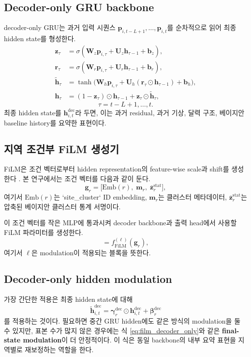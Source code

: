 \documentclass[11pt,a4paper]{article}
\begin{document}
\subsection{Decoder-only GRU backbone}
decoder-only GRU는 과거 입력 시퀀스 $\bm p_{i,t-L+1},\dots,\bm p_{i,t}$를 순차적으로 읽어 최종 hidden state를 형성한다.
\begin{align}
    \bm z_{\tau} &= \sigma(\bm W_z \bm p_{i,\tau} + \bm U_z \bm h_{\tau-1} + \bm b_z), \\
    \bm r_{\tau} &= \sigma(\bm W_r \bm p_{i,\tau} + \bm U_r \bm h_{\tau-1} + \bm b_r), \\
    \tilde{\bm h}_{\tau} &= \tanh\!\Big(\bm W_h \bm p_{i,\tau} + \bm U_h (\bm r_{\tau}\odot \bm h_{\tau-1}) + \bm b_h\Big), \\
    \bm h_{\tau} &= (1-\bm z_{\tau})\odot \bm h_{\tau-1} + \bm z_{\tau}\odot \tilde{\bm h}_{\tau},
\end{align}
\begin{equation}
    \tau=t-L+1,\dots,t.
\end{equation}
최종 hidden state를 $\bm h_{i,t}^{\mathrm{dec}}$라 두면, 이는 과거 residual, 과거 기상, 달력 구조, 베이지안 baseline history를 요약한 표현이다.

\subsection{지역 조건부 FiLM 생성기}
FiLM은 조건 벡터로부터 hidden representation의 feature-wise scale과 shift를 생성한다 \citep{Perez2017FiLM}. 본 연구에서는 조건 벡터를 다음과 같이 둔다.
\begin{equation}
    \bm g_r = \Big[
    \mathrm{Emb}(r),\;
    \bm m_r,\;
    \bar{\bm z}_r^{\mathrm{stat}}
    \Big],
\end{equation}
여기서 $\mathrm{Emb}(r)$는 `site_cluster` ID embedding, $\bm m_r$는 클러스터 메타데이터, $\bar{\bm z}_r^{\mathrm{stat}}$는 압축된 베이지안 클러스터 통계 서명이다.

이 조건 벡터를 작은 MLP에 통과시켜 decoder backbone과 출력 head에서 사용할 FiLM 파라미터를 생성한다.
\begin{equation}
    [\bm \gamma_r^{(\ell)},\;\bm \beta_r^{(\ell)}] = f_{\mathrm{FiLM}}^{(\ell)}(\bm g_r),
\end{equation}
여기서 $\ell$은 modulation이 적용되는 블록을 뜻한다.

\subsection{Decoder-only hidden modulation}
가장 간단한 적용은 최종 hidden state에 대해
\begin{equation}
    \widetilde{\bm h}_{i,t}^{\mathrm{dec}} =
    \bm \gamma_r^{\mathrm{dec}} \odot \bm h_{i,t}^{\mathrm{dec}}
    +
    \bm \beta_r^{\mathrm{dec}}
    \label{eq:film_decoder_only}
\end{equation}
를 적용하는 것이다. 필요하면 중간 GRU hidden에도 같은 방식의 modulation을 둘 수 있지만, 표본 수가 많지 않은 경우에는 식 \eqref{eq:film_decoder_only}와 같은 \textbf{final-state modulation}이 더 안정적이다. 이 식은 동일 backbone의 내부 요약 표현을 지역별로 재보정하는 역할을 한다.
\end{document}
